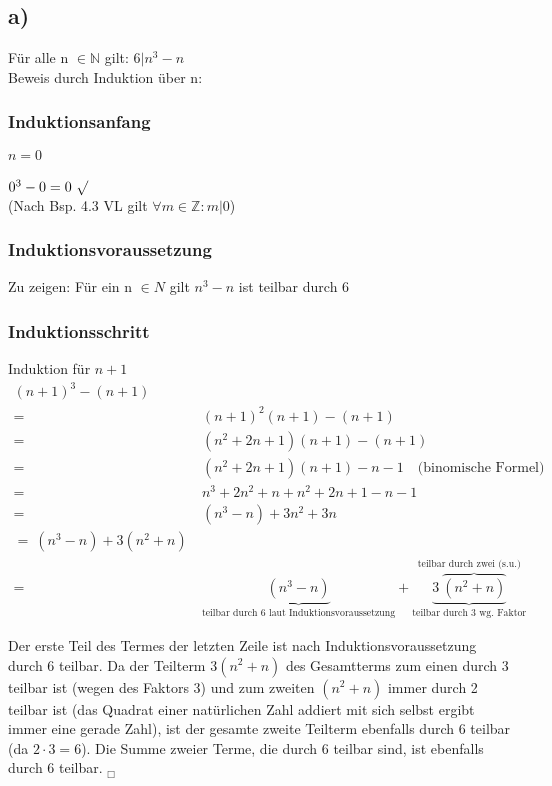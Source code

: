 \documentclass[11pt,a4paper]{article}
\begin{document}
\subsection*{a)}
Für alle n $ \in \mathbb{N}$ gilt: $6 |  n^3-n $ \\
Beweis durch Induktion über n:\\
\subsubsection*{Induktionsanfang}
$n=0$\\
\ \\
$0^3-0 = 0 ~ \surd$
\\ (Nach Bsp. 4.3 VL gilt $\forall m\in \mathbb{Z}: m|0$)
\subsubsection*{Induktionsvoraussetzung}
Zu zeigen: Für ein n $\in N$ gilt $n^3-n$ ist teilbar durch 6\\
\subsubsection*{Induktionsschritt}
Induktion für \(n+1\)
\begin{align*}
(n+1)^3 - (n+1) \\
= & ~ (n+1)^2(n+1) - (n+1) \\
= & ~ (n^2 + 2n + 1)(n+1) - (n + 1) \\
= & ~ (n^2 + 2n + 1)(n+1) - n - 1  \text{~~~(binomische Formel)} \\
= & ~ n^3 + 2n^2 + n + n^2 + 2n + 1  -n -1 \\
= & ~ (n^3 - n) + 3n^2 + 3n\\
= ~ (n^3 - n) + 3(n^2 + n) \\
= & ~ \underbrace{(n^3 - n)}_\text{teilbar durch 6 laut Induktionsvoraussetzung} + \underbrace{3~ \overbrace{(n^2 + n)}}_\text{teilbar durch 3 wg. Faktor}^\text{teilbar durch zwei (s.u.)}
\end{align*}

Der erste Teil des Termes der letzten Zeile ist nach Induktionsvoraussetzung durch 6 teilbar. Da der Teilterm \(3(n^2 + n)\) des Gesamtterms zum einen durch \(3\) teilbar ist (wegen des Faktors 3) und zum zweiten \((n^2+n)\) immer durch 2 teilbar ist (das Quadrat einer natürlichen Zahl addiert mit sich selbst ergibt immer eine gerade Zahl), ist der gesamte zweite Teilterm ebenfalls durch 6 teilbar (da \( 2 \cdot 3 = 6\)). Die Summe zweier Terme, die durch 6 teilbar sind, ist ebenfalls durch 6 teilbar. $_\Box$
\end{document}
